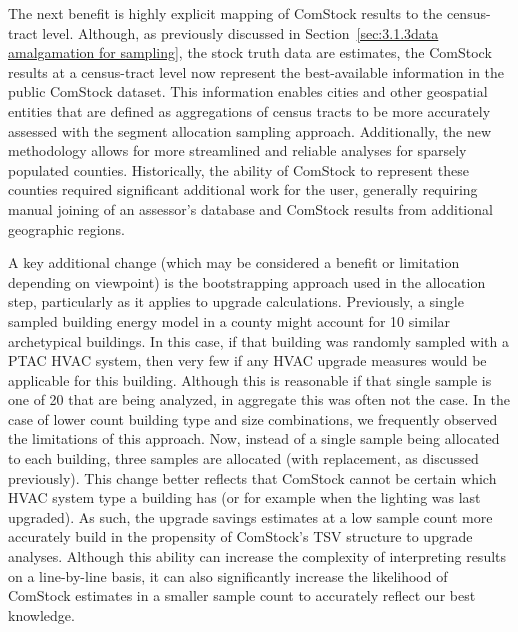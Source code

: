 The next benefit is highly explicit mapping of ComStock results to the census-tract level. Although, as previously discussed in Section~\ref{sec:3.1.3data amalgamation for sampling}, the stock truth data are estimates, the ComStock results at a census-tract level now represent the best-available information in the public ComStock dataset. This information enables cities and other geospatial entities that are defined as aggregations of census tracts to be more accurately assessed with the segment allocation sampling approach. Additionally, the new methodology allows for more streamlined and reliable analyses for sparsely populated counties. Historically, the ability of ComStock to represent these counties required significant additional work for the user, generally requiring manual joining of an assessor’s database and ComStock results from additional geographic regions.

A key additional change (which may be considered a benefit or limitation depending on viewpoint) is the bootstrapping approach used in the allocation step, particularly as it applies to upgrade calculations. Previously, a single sampled building energy model in a county might account for 10 similar archetypical buildings. In this case, if that building was randomly sampled with a PTAC HVAC system, then very few if any HVAC upgrade measures would be applicable for this building. Although this is reasonable if that single sample is one of 20 that are being analyzed, in aggregate this was often not the case. In the case of lower count building type and size combinations, we frequently observed the limitations of this approach. Now, instead of a single sample being allocated to each building, three samples are allocated (with replacement, as discussed previously). This change better reflects that ComStock cannot be certain which HVAC system type a building has (or for example when the lighting was last upgraded). As such, the upgrade savings estimates at a low sample count more accurately build in the propensity of ComStock's TSV structure to upgrade analyses. Although this ability can increase the complexity of interpreting results on a line-by-line basis, it can also significantly increase the likelihood of ComStock estimates in a smaller sample count to accurately reflect our best knowledge.

